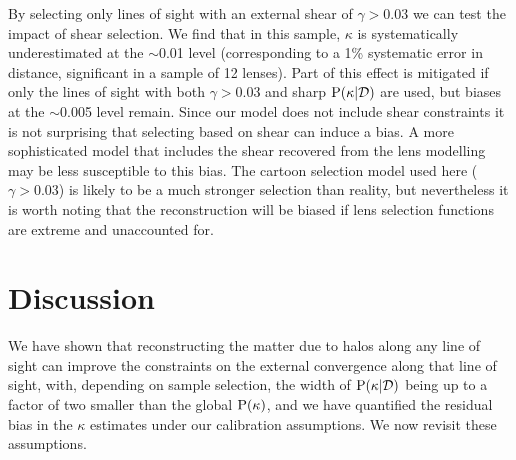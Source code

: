 \documentclass[useAMS,usenatbib]{mn2e}
\begin{document}
By selecting only lines of sight with an external shear of $\gamma>0.03$ we
can test the impact of shear selection. We find that in this sample, $\kappa$
is systematically underestimated at the $\sim$0.01 level (corresponding to a
1\% systematic error in distance, significant in a sample of 12 lenses). 
Part of this effect is mitigated if only
the lines of sight with both $\gamma>0.03$ and sharp ${\rm P}(\kappa|{\mathcal{D}})$ are
used, but biases at the $\sim$0.005 level remain. Since our model does not
include shear constraints it is not surprising that selecting based on shear
can induce a bias. A more sophisticated model that includes the shear
recovered from the lens modelling may be less susceptible to this bias. The
cartoon selection model used here ($\gamma>0.03$) is likely to be a much
stronger selection than reality, but nevertheless it is worth noting that the
reconstruction \proceedure will be biased if lens selection functions are
extreme and unaccounted for.



\section{Discussion}
\label{sec:discuss}

We have shown that reconstructing the matter due to halos along any line of
sight can improve the constraints on the external convergence along that line
of sight, with, depending on sample selection,  the width of
${\rm P}(\kappa|{\mathcal{D}})$ being up to a factor of two smaller than the global
${\rm P}(\kappa)$, and  we have quantified the residual bias in the $\kappa$
estimates under our calibration assumptions. We now revisit these assumptions.
\end{document}
